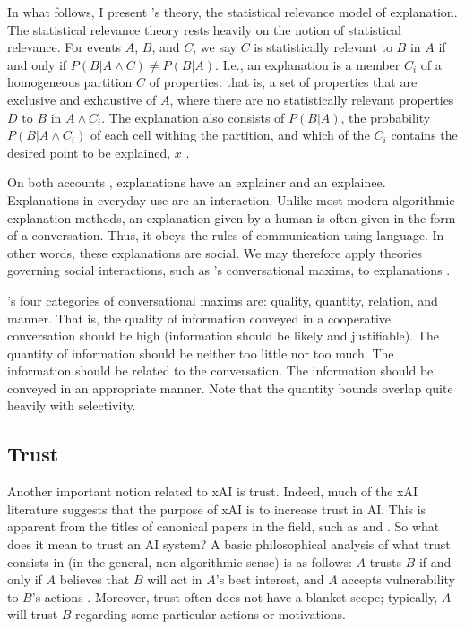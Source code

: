 In what follows, I present \textcite{woodward_scientific_2021}'s theory, the statistical relevance model of explanation. The statistical relevance theory rests heavily on the notion of statistical relevance. For events $A$, $B$, and $C$, we say $C$ is statistically relevant to $B$ in $A$ if and only if $P(B | A \land C) \neq P(B | A)$. I.e., an explanation is a member $C_i$ of a homogeneous partition $C$ of properties: that is, a set of properties that are exclusive and exhaustive of $A$, where there are no statistically relevant properties $D$ to $B$ in $A \land C_i$. The explanation also consists of $P(B | A)$, the probability $P(B | A \land C_i)$ of each cell withing the partition, and which of the $C_i$ contains the desired point to be explained, $x$ \cite{woodward_scientific_2021}.

On both accounts , explanations have an explainer and an explainee. Explanations in everyday use are an interaction. Unlike most modern algorithmic explanation methods, an explanation given by a human is often given in the form of a conversation. Thus, it obeys the rules of communication using language. In other words, these explanations are social. We may therefore apply theories governing social interactions, such as \textcite{Grice_1975}'s conversational maxims, to explanations \cite{miller_explanation_2017}.

\textcite{Grice_1975}'s four categories of conversational maxims are: quality, quantity, relation, and manner. That is, the quality of information conveyed in a cooperative conversation should be high (information should be likely and justifiable). The quantity of information should be neither too little nor too much. The information should be related to the conversation. The information should be conveyed in an appropriate manner. Note that the quantity bounds overlap quite heavily with selectivity.

\subsection{Trust}
Another important notion related to xAI is trust. Indeed, much of the xAI literature suggests that the purpose of xAI is to increase trust in AI. This is apparent from the titles of canonical papers in the field, such as \textcite{ribeiro_why_2016} and \textcite{pieters_explanation_2011}. So what does it mean to trust an AI system? A basic philosophical analysis of what trust consists in (in the general, non-algorithmic sense) is as follows: $A$ trusts $B$ if and only if $A$ believes that $B$ will act in $A$'s best interest, and $A$ accepts vulnerability to $B$'s actions \cite{jacovi_formalizing_2021}. Moreover, trust often does not have a blanket scope; typically, $A$ will trust $B$ regarding some particular actions or motivations.

